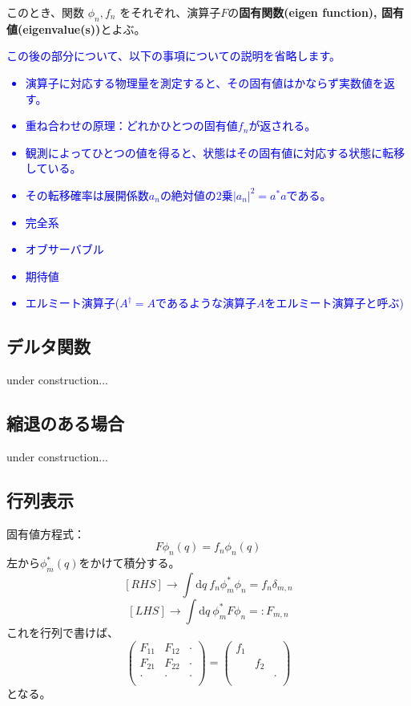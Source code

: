 \documentclass[a4j,10pt,oneside,openany]{jsbook}
\begin{document}
このとき、関数 $\phi_n, f_n$ をそれぞれ、演算子$F$の\textbf{固有関数(eigen function), 固有値(eigenvalue(s))}とよぶ。
\\

\textcolor{blue}{
この後の部分について、以下の事項についての説明を省略します。
\begin{itemize}
	\item 演算子に対応する物理量を測定すると、その固有値はかならず実数値を返す。
	\item 重ね合わせの原理：どれかひとつの固有値$f_n$が返される。
	\item 観測によってひとつの値を得ると、状態はその固有値に対応する状態に転移している。
	\item その転移確率は展開係数$a_n$の絶対値の2乗$|a_n|^2 = a^* a$である。
	\item 完全系
	\item オブサーバブル
	\item 期待値
	\item エルミート演算子($A^\dagger = A$であるような演算子$A$をエルミート演算子と呼ぶ)
\end{itemize}
}

\hrulefill


\subsection{デルタ関数}
under construction...

\subsection{縮退のある場合}
under construction...

\hrulefill
\subsection{行列表示}
固有値方程式：\[ F\phi_n(q) = f_n \phi_n(q)\]
左から$\phi_m^*(q)$をかけて積分する。
\[
	\left[ RHS \right] \rightarrow \int \mathrm{d}q\  f_n \phi_m^* \phi_n = f_n \delta_{m,n}
\]
\[
	\left[ LHS \right] \rightarrow \int \mathrm{d}q\ \phi_m^* F \phi_n =: F_{m,n}
\]
これを行列で書けば、
\[
	\begin{pmatrix}
		F_{11} & F_{12} & \cdot \\
		F_{21} & F_{22} & \cdot \\
		\cdot & \cdot & \cdot \\
	\end{pmatrix}
	= 
	\begin{pmatrix}
		f_1 & & \\
		 & f_2 & \\
		 & & \cdot \\
	\end{pmatrix}
\]
となる。
\end{document}
